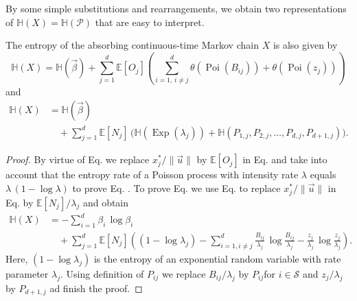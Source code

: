 \documentclass[smallextended]{svjour3}
\makeatletter
\renewcommand*{\eqref}[1]{%
  \hyperref[{#1}]{\textup{\tagform@{\ref*{#1}}}}%
}
\newcommand{\E}{\mathbb{E}}
\renewcommand{\H}{\mathbb{H}}
\newcommand{\Exp}{\operatorname{Exp}}
\newcommand{\Poi}{\operatorname{Poi}}
\newcommand{\suml}{\sum\limits}
\newcommand{\vnorms}[1]{\|#1\|}
\makeatother
\begin{document}
By some simple substitutions and rearrangements, we obtain two representations of $\H(X)=\H(\mathcal{P})$ that are easy to interpret.

\begin{proposition}\label{prop:entropy_of_X}
	The entropy of the absorbing continuous-time Markov chain $X$ is also given by
	\begin{equation}
	  \label{eqn:H_occupation_time}
	  \H(X) = \H(\vec{\beta}) + \suml_{j=1}^d \E\left[O_j\right] \left(\suml_{i=1,\,i\neq j}^d \theta(\Poi(B_{ij})) + \theta(\Poi(z_j))\right)
	\end{equation}
	and
	\begin{equation}
	  \label{eqn:H_number_of_visits}
	  \begin{aligned}
      \H(X)& = \H(\vec{\beta})\\
      &\quad + \suml_{j=1}^d \E\left[N_j\right]\, \bigg(\H(\Exp(\lambda_j)) + \H(P_{1,j}, P_{2, j},\ldots,P_{d, j}, P_{d+1,j})\bigg).
    \end{aligned}
  \end{equation}
\end{proposition}

\begin{proof}
  By virtue of Eq. \eqref{eqn:H_occupation_time} we replace $x^\ast_j/\vnorms{\vec{u}}$ by $\E\left[O_j\right]$ in Eq. \eqref{eqn:H_X} and take into account that the entropy rate of a Poisson process with intensity rate $\lambda$ equals $\lambda\,(1-\log \lambda)$ to prove Eq. \eqref{eqn:H_occupation_time}.
  To prove Eq. \eqref{eqn:H_number_of_visits} we use Eq. \eqref{eqn:N_i} to replace $x^\ast_j/\vnorms{\vec{u}}$ in Eq. \eqref{eqn:H_X} by $\E\left[N_j\right]/\lambda_j$ and obtain
  \begin{equation*}
    \begin{aligned}
      \H(X) &= -\suml_{i=1}^d\beta_i\,\log\beta_i\\
      &\quad + \suml_{j=1}^d \E\left[N_j\right]\left((1-\log \lambda_j) - \suml_{i=1,i\neq j}^d \frac{B_{ij}}{\lambda_j}\,\log \frac{B_{ij}}{\lambda_j} - \frac{z_j}{\lambda_j}\,\log \frac{z_j}{\lambda_j}\right).
    \end{aligned}
	\end{equation*}
	Here, $(1-\log \lambda_j)$ is the entropy of an exponential random variable with rate parameter $\lambda_j$.
	Using definition \eqref{eqn:P_ij} of $P_{ij}$ we replace $B_{ij}/\lambda_j$ by $P_{ij}$for $i\in\mathcal{S}$ and $z_j/\lambda_j$ by $P_{d+1,j}$ ad finish the proof.
\end{proof}
\end{document}
